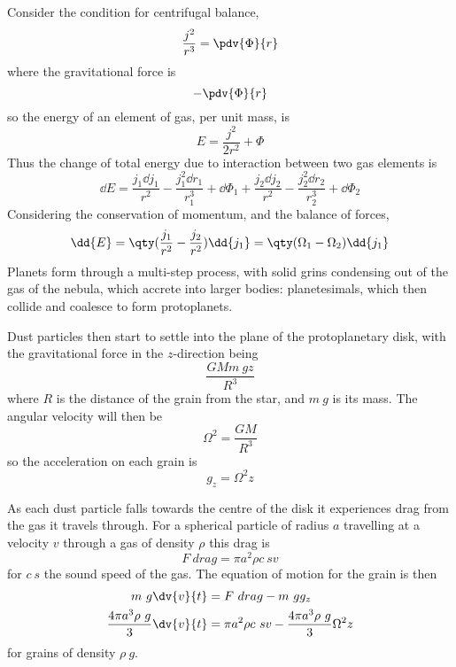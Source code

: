 Consider the condition for centrifugal balance,
\begin{equation}
  \label{eq:36}
  \frac{j^2}{r^3} = \pdv{\Phi}{r}
\end{equation}
where the gravitational force is 
\[ - \pdv{\Phi}{r} \]
so the energy of an element of gas, per unit mass, is
\begin{equation}
  \label{eq:37}
  E = \frac{j^2}{2r^2} + \Phi
\end{equation}
Thus the change of total energy due to interaction between two gas
elements is
\begin{equation}
  \label{eq:38}
  \dd{E} = \frac{j_1 \dd{j_1}}{r^2} - \frac{j_1^2 \dd{r_1}}{r_1^3} + \dd{\Phi_1} + \frac{j_2 \dd{j_2}}{r^2} - \frac{j_2^2 \dd{r_2}}{r_2^3} + \dd{\Phi_2}
\end{equation}
Considering the conservation of momentum, and the balance of forces,
\begin{equation}
  \label{eq:39}
  \dd{E} = \qty( \frac{j_1}{r^2} - \frac{j_2}{r^2} )\dd{j_1} = \qty( \Omega_1 - \Omega_2 ) \dd{j_1}
\end{equation}
Planets form through a multi-step process, with solid grins condensing
out of the gas of the nebula, which accrete into larger bodies:
planetesimals, which then collide and coalesce to form protoplanets.

Dust particles then start to settle into the plane of the
protoplanetary disk, with the gravitational force in the $z$-direction
being
\begin{equation}
  \label{eq:40}
  \frac{GM m~g z}{R^3}
\end{equation}
where $R$ is the distance of the grain from the star, and $m~g$ is its
mass. The angular velocity will then be
\begin{equation}
  \label{eq:41}
  \Omega^2 = \frac{GM}{R^3}
\end{equation}
so the acceleration on each grain is
\begin{equation}
  \label{eq:42}
  g_z = \Omega^2 z
\end{equation}

As each dust particle falls towards the centre of the disk it
experiences drag from the gas it travels through. For a spherical
particle of radius $a$ travelling at a velocity $v$ through a gas of
density $\rho$ this drag is
\begin{equation}
  \label{eq:43}
  F~{drag} = \pi a^2 \rho c~s v
\end{equation}
for $c~s$ the sound speed of the gas. The equation of motion for the
grain is then
\begin{align}
  m~g \dv{v}{t} &= F~{drag} - m~g g_z \\
\frac{4 \pi a^3 \rho~g}{3} \dv{v}{t} &= \pi a^2 \rho c~s v - \frac{4 \pi a^3 \rho~g}{3} \Omega^2 z
\end{align}
for grains of density $\rho~g$.

